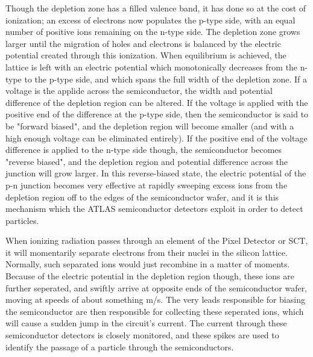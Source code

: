         Though the depletion zone has a filled valence band, it has done so at the cost of ionization; an excess of electrons now populates the p-type side, with an equal number of positive ions remaining on the n-type side.
        The depletion zone grows larger until the migration of holes and electrons is balanced by the electric potential created through this ionization.
        When equilibrium is achieved, the lattice is left with an electric potential which monotonically decreases from the n-type to the p-type side, and which spans the full width of the depletion zone. %
        If a voltage is the applide across the semiconductor, the width and potential difference of the depletion region can be altered.
        If the voltage is applied with the positive end of the difference at the p-type side, then the semiconductor is said to be "forward biased", and the depletion region will become smaller (and with a high enough voltage can be eliminated entirely). \cite{wiley_radiation_detection}
        If the positive end of the voltage difference is applied to the n-type side though, the semiconductor becomes "reverse biased", and the depletion region and potential difference across the junction will grow larger.
        In this reverse-biased state, the electric potential of the p-n junction becomes very effective at rapidly sweeping excess ions from the depletion region off to the edges of the semiconductor wafer, and it is this mechanism which the ATLAS semiconductor detectors exploit in order to detect particles.

        When ionizing radiation passes through an element of the Pixel Detector or SCT, it will momentarily separate electrons from their nuclei in the silicon lattice.
        Normally, such separated ions would just recombine in a matter of moments.
        Because of the electric potential in the depletion region though, these ions are further seperated, and swiftly arrive at opposite ends of the semiconductor wafer, moving at speeds of about something m/s.%
        The very leads responsible for biasing the semiconductor are then responsible for collecting these seperated ions, which will cause a sudden jump in the circuit's current.
        The current through these semiconductor detectors is closely monitored, and these spikes are used to identify the passage of a particle through the semiconductors.




